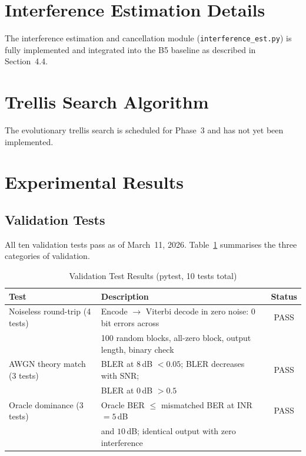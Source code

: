 \documentclass[11pt,a4paper]{article}
\begin{document}
\section{Interference Estimation Details}

The interference estimation and cancellation module (\texttt{interference\_est.py}) is fully implemented and integrated into the B5 baseline as described in Section~4.4.

\section{Trellis Search Algorithm}

The evolutionary trellis search is scheduled for Phase~3 and has not yet been implemented.

\section{Experimental Results}

\subsection{Validation Tests}

All ten validation tests pass as of March~11, 2026. Table~\ref{tab:tests} summarises the three categories of validation.

\begin{table}[h]
\centering
\caption{Validation Test Results (pytest, 10 tests total)}
\label{tab:tests}
\begin{tabular}{@{}llc@{}}
\toprule
\textbf{Test} & \textbf{Description} & \textbf{Status} \\
\midrule
Noiseless round-trip (4 tests)      & Encode $\to$ Viterbi decode in zero noise: 0 bit errors across & PASS \\
                                      & 100 random blocks, all-zero block, output length, binary check & \\
AWGN theory match (3 tests)          & BLER at 8\,dB $< 0.05$; BLER decreases with SNR;              & PASS \\
                                      & BLER at 0\,dB $> 0.5$                                          & \\
Oracle dominance (3 tests)           & Oracle BER $\leq$ mismatched BER at INR $= 5$\,dB             & PASS \\
                                      & and $10$\,dB; identical output with zero interference           & \\
\bottomrule
\end{tabular}
\end{table}
\end{document}
